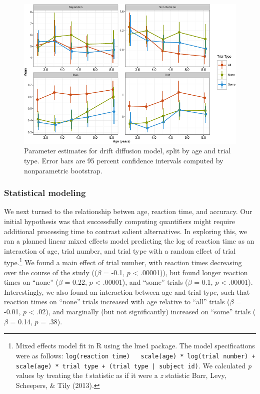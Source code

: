 \documentclass[10pt, letterpaper]{article}
\newenvironment{CodeChunk}{}{}
\begin{document}
\begin{CodeChunk}
\begin{figure}[t]

{\centering \includegraphics{figs/param_plot-1} 

}

\caption[Parameter estimates for drift diffusion model, split by age and trial type]{Parameter estimates for drift diffusion model, split by age and trial type. Error bars are 95 percent confidence intervals computed by nonparametric bootstrap.}\label{fig:param_plot}
\end{figure}
\end{CodeChunk}

\subsubsection{Statistical modeling}\label{statistical-modeling-1}

We next turned to the relationship betwen age, reaction time, and
accuracy. Our initial hypothesis was that successfully computing
quantifiers might require additional processing time to contrast salient
alternatives. In exploring this, we ran a planned linear mixed effects
model predicting the log of reaction time as an interaction of age,
trial number, and trial type with a random effect of trial
type.\footnote{Mixed effects model fit in R using the lme4 package. The
  model specifications were as follows:
  \texttt{log(reaction time) ~ scale(age) * log(trial number) + scale(age) * trial type + (trial type | subject id)}.
  We calculated \emph{p} values by treating the \emph{t} statistic as if
  it were a \emph{z} statistic Barr, Levy, Scheepers, \& Tily (2013).}
We found a main effect of trial number, with reaction times decreasing
over the course of the study ((\(\beta\) = -0.1, \(p\) \textless{}
.00001)), but found longer reaction times on ``none'' (\(\beta\) = 0.22,
\(p\) \textless{} .00001), and ``some'' trials (\(\beta\) = 0.1, \(p\)
\textless{} .00001). Interestingly, we also found an interaction between
age and trial type, such that reaction times on ``none'' trials
increased with age relative to ``all'' trials (\(\beta\) = -0.01, \(p\)
\textless{} .02), and marginally (but not significantly) increased on
``some'' trials (\(\beta\) = 0.14, \(p\) = .38).
\end{document}
